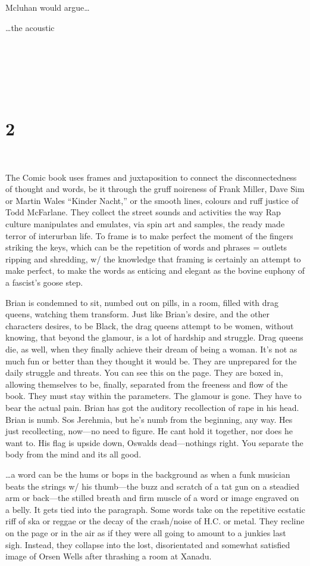 \documentclass[
]{memoir}
\begin{document}
Mcluhan would argue\ldots{}

\ldots{}the acoustic

~

~

~

\hypertarget{section-1}{%
\section*{2}\label{section-1}}

~

The Comic book uses frames and juxtaposition to connect the
disconnectedness of thought and words, be it through the gruff noireness
of Frank Miller, Dave Sim or Martin Wales ``Kinder Nacht,'' or the
smooth lines, colours and ruff justice of Todd McFarlane. They collect
the street sounds and activities the way Rap culture manipulates and
emulates, via spin art and samples, the ready made terror of interurban
life. To frame is to make perfect the moment of the fingers striking the
keys, which can be the repetition of words and phrases = outlets ripping
and shredding, w/ the knowledge that framing is certainly an attempt to
make perfect, to make the words as enticing and elegant as the bovine
euphony of a fascist's goose step.

Brian is condemned to sit, numbed out on pills, in a room, filled with
drag queens, watching them transform. Just like Brian's desire, and the
other characters desires, to be Black, the drag queens attempt to be
women, without knowing, that beyond the glamour, is a lot of hardship
and struggle. Drag queens die, as well, when they finally achieve their
dream of being a woman. It's not as much fun or better than they thought
it would be. They are unprepared for the daily struggle and threats. You
can see this on the page. They are boxed in, allowing themselves to be,
finally, separated from the freeness and flow of the book. They must
stay within the parameters. The glamour is gone. They have to bear the
actual pain. Brian has got the auditory recollection of rape in his
head. Brian is numb. Sos Jerehmia, but he's numb from the beginning, any
way. Hes just recollecting, now---no need to figure. He cant hold it
together, nor does he want to. His flag is upside down, Oswalds
dead---nothings right. You separate the body from the mind and its all
good.

\ldots{}a word can be the hums or bops in the background as when a funk
musician beats the strings w/ his thumb---the buzz and scratch of a tat
gun on a steadied arm or back---the stilled breath and firm muscle of a
word or image engraved on a belly. It gets tied into the paragraph. Some
words take on the repetitive ecstatic riff of ska or reggae or the decay
of the crash/noise of H.C. or metal. They recline on the page or in the
air as if they were all going to amount to a junkies last sigh. Instead,
they collapse into the lost, disorientated and somewhat satisfied image
of Orsen Wells after thrashing a room at Xanadu.
\end{document}
